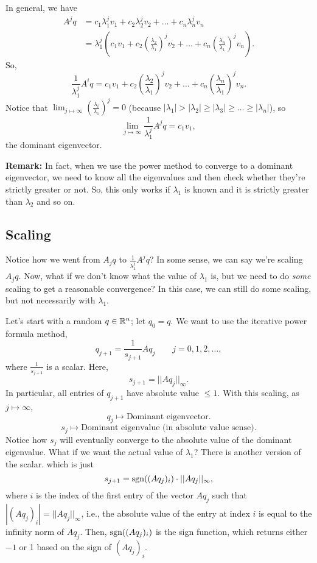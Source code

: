 \documentclass[letterpaper]{article}
\newcommand{\0}{\mathbf{0}}
\begin{document}
In general, we have 
\begin{equation*}
    \begin{aligned}
        A^j q &= c_1 \lambda_1^j v_1 + c_2 \lambda_2^j v_2 + \hdots + c_n \lambda_n^j v_n \\ 
            &= \lambda_1^j \left(c_1 v_1 + c_2 \left(\frac{\lambda_2}{\lambda_1}\right)^j v_2 + \hdots + c_n \left(\frac{\lambda_n}{\lambda_1}\right)^j v_n\right).
    \end{aligned}
\end{equation*}
So, 
\[\frac{1}{\lambda_1^j} A^i q = c_1 v_1 + c_2 \left(\frac{\lambda_2}{\lambda_1}\right)^j v_2 + \hdots + c_n \left(\frac{\lambda_n}{\lambda_1}\right)^j v_n.\]
Notice that $\lim_{j \mapsto \infty} \left(\frac{\lambda_i}{\lambda_1}\right)^j = 0$ (because $|\lambda_1| > |\lambda_2| \geq |\lambda_3| \geq \hdots \geq |\lambda_n|$), so \[\lim_{j \mapsto \infty} \frac{1}{\lambda_1^j} A^j q = c_1 v_1,\]
the dominant eigenvector.

\bigskip 

\textbf{Remark:} In fact, when we use the power method to converge to a dominant eigenvector, we need to know all the eigenvalues and then check whether they're strictly greater or not. So, this only works if $\lambda_1$ is known and it is strictly greater than $\lambda_2$ and so on. 

\subsection{Scaling}
Notice how we went from $A_j q$ to $\frac{1}{\lambda_1^j} A^j q$? In some sense, we can say we're scaling $A_j q$. Now, what if we don't know what the value of $\lambda_1$ is, but we need to do \emph{some} scaling to get a reasonable convergence? In this case, we can still do some scaling, but not necessarily with $\lambda_1$. 

\bigskip 

Let's start with a random $q \in \mathbb{R}^n$; let $q_0 = q$. We want to use the iterative power formula method, 
\[\boxed{q_{j + 1} = \frac{1}{s_{j + 1}} Aq_j \qquad j = 0, 1, 2, \hdots},\]
where $\frac{1}{s_{j + 1}}$ is a scalar. Here, 
\[s_{j + 1} = ||Aq_j||_\infty.\]
In particular, all entries of $q_{j + 1}$ have absolute value $\leq 1$. With this scaling, as $j \mapsto \infty$, 
\[q_j \mapsto \text{Dominant eigenvector.}\]
\[s_j \mapsto \text{Dominant eigenvalue (in absolute value sense).}\]
Notice how $s_j$ will eventually converge to the absolute value of the dominant eigenvalue. What if we want the actual value of $\lambda_1$? There is another version of the scalar. which is just 
\[s_{j + 1} = \operatorname{sgn}((Aq_{j})_i) \cdot ||Aq_j||_\infty,\]
where $i$ is the index of the first entry of the vector $Aq_j$ such that $|(Aq_j)_{i}| = ||Aq_j||_\infty$, i.e., the absolute value of the entry at index $i$ is equal to the infinity norm of $Aq_j$. Then, $\operatorname{sgn}((Aq_{j})_i)$ is the sign function, which returns either $-1$ or 1 based on the sign of $(Aq_{j})_i$.  
\end{document}
